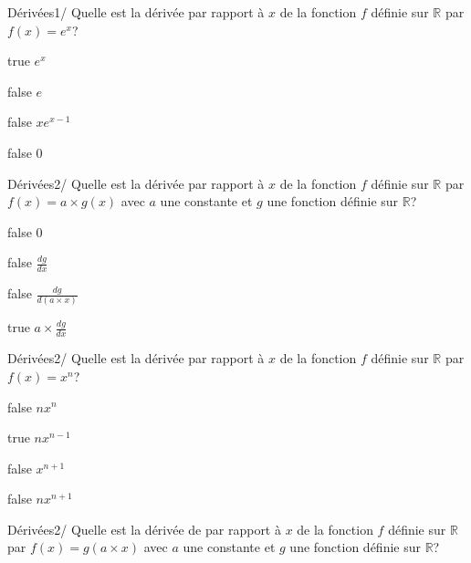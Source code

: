         	\begin{question}{22}{Dérivées}{1}{/}
				Quelle est la dérivée par rapport à $x$ de la fonction $f$ définie sur $\mathbb{R}$ par $f(x)=e^x$?
            \end{question}
            \begin{reponses}
            	\item[true] $e^x$
            	\item[false] $e$
                \item[false] $xe^{x-1}$
                \item[false] 0
            \end{reponses}
        	\begin{question}{22}{Dérivées}{2}{/}
				Quelle est la dérivée par rapport à $x$ de la fonction $f$ définie sur $\mathbb{R}$ par $f(x)=a\times g(x)$ avec $a$ une constante et $g$ une fonction définie sur $\mathbb{R}$?
            \end{question}
            \begin{reponses}
            	\item[false] $0$
            	\item[false] $\frac{dg}{dx}$
                \item[false] $\frac{dg}{d(a\times x)}$
                \item[true] $a\times \frac{dg}{dx}$
            \end{reponses}
        	\begin{question}{22}{Dérivées}{2}{/}
				Quelle est la dérivée par rapport à $x$ de la fonction $f$ définie sur $\mathbb{R}$ par $f(x)=x^n$?
            \end{question}
            \begin{reponses}
            	\item[false] $nx^n$
            	\item[true] $nx^{n-1}$
                \item[false] $x^{n+1}$
                \item[false] $nx^{n+1}$
            \end{reponses}
        	\begin{question}{22}{Dérivées}{2}{/}
				Quelle est la dérivée de par rapport à $x$ de la fonction $f$ définie sur $\mathbb{R}$ par $f(x)= g(a\times x)$ avec $a$ une constante et $g$ une fonction définie sur $\mathbb{R}$?
            \end{question}
